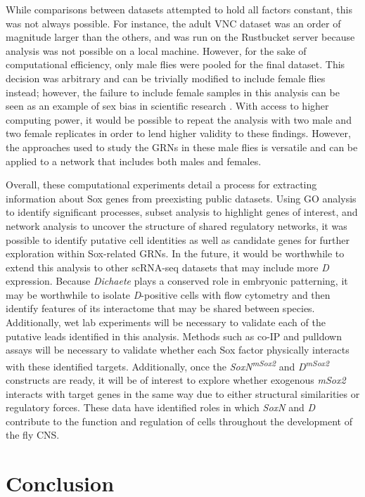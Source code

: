 \documentclass[withindex,glossary]{cam-thesis}
\begin{document}
While comparisons between datasets attempted to hold all factors
constant, this was not always possible. For instance, the adult VNC
dataset was an order of magnitude larger than the others, and was run on
the Rustbucket server because analysis was not possible on a local
machine. However, for the sake of computational efficiency, only male
flies were pooled for the final dataset. This decision was arbitrary and
can be trivially modified to include female flies instead; however, the
failure to include female samples in this analysis can be seen as an
example of sex bias in scientific research . With
access to higher computing power, it would be possible to repeat the
analysis with two male and two female replicates in order to lend higher
validity to these findings. However, the approaches used to study the
GRNs in these male flies is versatile and can be applied to a network
that includes both males and females.

Overall, these computational experiments detail a process for extracting
information about Sox genes from preexisting public datasets. Using GO
analysis to identify significant processes, subset analysis to highlight
genes of interest, and network analysis to uncover the structure of shared regulatory networks, it was possible to identify putative cell 
identities as well as candidate genes for further exploration within
Sox-related GRNs. In the future, it would be worthwhile to extend this
analysis to other scRNA-seq datasets that may include more \emph{D}
expression. Because \emph{Dichaete} plays a conserved role in embryonic
patterning, it may be worthwhile to isolate \emph{D}-positive cells with
flow cytometry and then identify features of its interactome that may be
shared between species. Additionally, wet lab experiments will be
necessary to validate each of the putative leads identified in this
analysis. Methods such as co-IP and pulldown assays will be necessary to
validate whether each Sox factor physically interacts with these
identified targets. Additionally, once the
\emph{SoxN\textsuperscript{mSox2}} and \emph{D\textsuperscript{mSox2}}
constructs are ready, it will be of interest to explore whether
exogenous \emph{mSox2} interacts with target genes in the same way due
to either structural similarities or regulatory forces. These data have
identified roles in which \emph{SoxN} and \emph{D} contribute to the
function and regulation of cells throughout the development of the fly
CNS.

\chapter{Conclusion}
\end{document}
